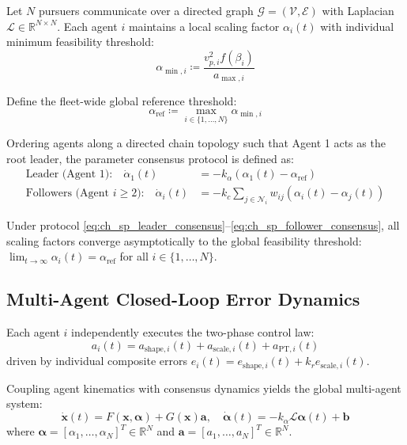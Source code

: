 Let $N$ pursuers communicate over a directed graph $\mathcal{G} = (\mathcal{V}, \mathcal{E})$ with Laplacian $\mathcal{L} \in \mathbb{R}^{N \times N}$. Each agent $i$ maintains a local scaling factor $\alpha_i(t)$ with individual minimum feasibility threshold:
\begin{equation}\label{eq:ch_sp_alpha_min_i}
	\alpha_{\min, i} \coloneqq \frac{v_{p,i}^2 f(\beta_i)}{a_{\max, i}}
\end{equation}

Define the fleet-wide global reference threshold:
\begin{equation}\label{eq:ch_sp_alpha_ref_global}
	\alpha_{\text{ref}} \coloneqq \max_{i \in \{1, \dots, N\}} \alpha_{\min, i}
\end{equation}

Ordering agents along a directed chain topology such that Agent 1 acts as the root leader, the parameter consensus protocol is defined as:
\begin{align}
	\text{Leader (Agent 1):} \quad \dot{\alpha}_1(t) &= -k_\alpha (\alpha_1(t) - \alpha_{\text{ref}}) \label{eq:ch_sp_leader_consensus} \\
	\text{Followers (Agent } i \ge 2\text{):} \quad \dot{\alpha}_i(t) &= -k_c \sum_{j \in \mathcal{N}_i} w_{ij} (\alpha_i(t) - \alpha_j(t)) \label{eq:ch_sp_follower_consensus}
\end{align}

Under protocol \eqref{eq:ch_sp_leader_consensus}--\eqref{eq:ch_sp_follower_consensus}, all scaling factors converge asymptotically to the global feasibility threshold: $\lim_{t \to \infty} \alpha_i(t) = \alpha_{\text{ref}}$ for all $i \in \{1, \dots, N\}$.
\subsection{Multi-Agent Closed-Loop Error Dynamics}

Each agent $i$ independently executes the two-phase control law:
\begin{equation}\label{eq:ch_sp_ai_multi}
	a_i(t) = a_{\text{shape}, i}(t) + a_{\text{scale}, i}(t) + a_{\text{PT}, i}(t)
\end{equation}
driven by individual composite errors $e_i(t) = e_{\text{shape}, i}(t) + k_r e_{\text{scale}, i}(t)$. 

Coupling agent kinematics with consensus dynamics yields the global multi-agent system:
\begin{equation}\label{eq:ch_sp_global_multi_system}
	\dot{\mathbf{x}}(t) = F(\mathbf{x}, \boldsymbol{\alpha}) + G(\mathbf{x}) \mathbf{a}, \quad \dot{\boldsymbol{\alpha}}(t) = -k_\alpha \mathcal{L} \boldsymbol{\alpha}(t) + \mathbf{b}
\end{equation}
where $\boldsymbol{\alpha} = [\alpha_1, \dots, \alpha_N]^T \in \mathbb{R}^N$ and $\mathbf{a} = [a_1, \dots, a_N]^T \in \mathbb{R}^N$.

